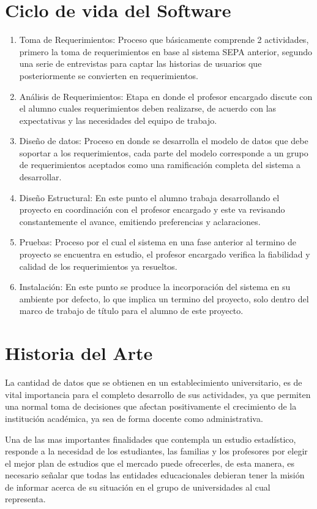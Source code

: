 \documentclass[a4paper,12pt,openany,oneside]{book}
\begin{document}
\section{Ciclo de vida del Software}
\begin{enumerate}
\item Toma de Requerimientos: Proceso que básicamente comprende 2 actividades, primero la toma de requerimientos en base al sistema SEPA anterior, segundo una serie de entrevistas para captar las historias de usuarios que posteriormente se convierten en requerimientos.
\item Análisis de Requerimientos: Etapa en donde el profesor encargado discute con el alumno cuales requerimientos deben realizarse, de acuerdo con las expectativas y las necesidades del equipo de trabajo.
\item Diseño de datos: Proceso en donde se desarrolla el modelo de datos que debe soportar a los requerimientos, cada parte del modelo corresponde a un grupo de requerimientos aceptados como una ramificación completa del sistema a desarrollar.
\item Diseño Estructural: En este punto el alumno trabaja desarrollando el proyecto en coordinación con el profesor encargado y este va revisando constantemente el avance, emitiendo preferencias y aclaraciones.
\item Pruebas: Proceso por el cual el sistema en una fase anterior al termino de proyecto se encuentra en estudio, el profesor encargado verifica la fiabilidad y calidad de los requerimientos ya resueltos.
\item Instalación: En este punto se produce la incorporación del sistema en su ambiente por defecto, lo que implica un termino del proyecto, solo dentro del marco de trabajo de título para el alumno de este proyecto.
\end{enumerate}
\section{Historia del Arte}
La cantidad de datos que se obtienen en un establecimiento universitario, es de vital importancia para el completo desarrollo de sus actividades, ya que permiten una normal toma de decisiones que afectan positivamente el crecimiento de la institución académica, ya sea de forma docente como administrativa. 

Una de las mas importantes finalidades que contempla un estudio estadístico, responde a la necesidad de los estudiantes, las familias y los profesores por elegir el mejor plan de estudios que el mercado puede ofrecerles, de esta manera, es necesario señalar que todas las entidades educacionales debieran tener la misión de informar acerca de su situación en el grupo de universidades al cual representa.
\end{document}
